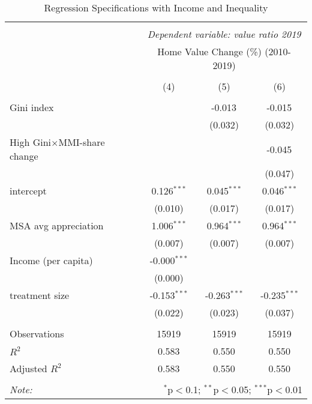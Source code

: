 \documentclass{article}
\begin{document}
\begin{table}[H] \centering
    \caption{Regression Specifications with Income and Inequality}
    \begin{tabular}{@{\extracolsep{5pt}}lccc}
    \\[-1.8ex]\hline
    \hline \\[-1.8ex]
    & \multicolumn{3}{c}{\textit{Dependent variable: value ratio 2019}} \
    \cr \cline{2-4}
    \\[-1.8ex] & \multicolumn{3}{c}{Home Value Change (\%) (2010-2019)}  \\
    \\[-1.8ex] & (4) & (5) & (6) \\
    \hline \\[-1.8ex]
    Gini index & & -0.013$^{}$ & -0.015$^{}$ \\
   & & (0.032) & (0.032) \\
   High Gini$\times$MMI-share change & & & -0.045$^{}$ \\
   & & & (0.047) \\
    intercept & 0.126$^{***}$ & 0.045$^{***}$ & 0.046$^{***}$ \\
   & (0.010) & (0.017) & (0.017) \\
   MSA avg appreciation & 1.006$^{***}$ & 0.964$^{***}$ & 0.964$^{***}$ \\
   & (0.007) & (0.007) & (0.007) \\
    Income (per capita) & -0.000$^{***}$ & & \\
   & (0.000) & & \\
    treatment size & -0.153$^{***}$ & -0.263$^{***}$ & -0.235$^{***}$ \\
   & (0.022) & (0.023) & (0.037) \\
   \hline \\[-1.8ex]
    Observations & 15919 & 15919 & 15919 \\
    $R^2$ & 0.583 & 0.550 & 0.550 \\
    Adjusted $R^2$ & 0.583 & 0.550 & 0.550 \\
    \hline
    \hline \\[-1.8ex]
    \textit{Note:} & \multicolumn{3}{r}{$^{*}$p$<$0.1; $^{**}$p$<$0.05; $^{***}$p$<$0.01} \\
    \end{tabular}
\end{table}
        
\end{document}
